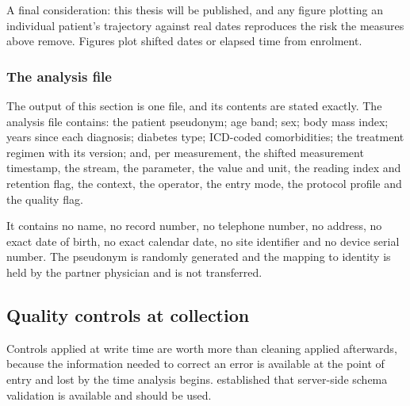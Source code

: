 \documentclass[12pt,a4paper,oneside]{report}
\begin{document}
A final consideration: this thesis will be published, and any figure plotting an individual patient's trajectory against real dates reproduces the risk the measures above remove. Figures plot shifted dates or elapsed time from enrolment.

\subsubsection{The analysis file}

The output of this section is one file, and its contents are stated exactly. The analysis file contains: the patient pseudonym; age band; sex; body mass index; years since each diagnosis; diabetes type; ICD-coded comorbidities; the treatment regimen with its version; and, per measurement, the shifted measurement timestamp, the stream, the parameter, the value and unit, the reading index and retention flag, the context, the operator, the entry mode, the protocol profile and the quality flag.

It contains no name, no record number, no telephone number, no address, no exact date of birth, no exact calendar date, no site identifier and no device serial number. The pseudonym is randomly generated and the mapping to identity is held by the partner physician and is not transferred.

\subsection{Quality controls at collection}\label{sec:quality}

Controls applied at write time are worth more than cleaning applied afterwards, because the information needed to correct an error is available at the point of entry and lost by the time analysis begins.  established that server-side schema validation is available and should be used.
\end{document}
